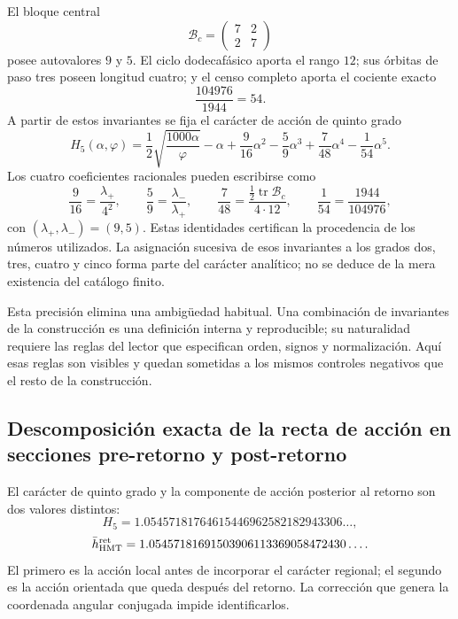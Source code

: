 
El bloque central
\[
\mathcal B_c=\begin{pmatrix}7&2\\2&7\end{pmatrix}
\]
posee autovalores \(9\) y \(5\). El ciclo dodecafásico aporta el rango
\(12\); sus órbitas de paso tres poseen longitud cuatro; y el censo completo
aporta el cociente exacto
\[
\frac{104976}{1944}=54.
\]
A partir de estos invariantes se fija el carácter de acción de quinto grado
\[
\boxed{
H_5(\alpha,\varphi)
=\frac12\sqrt{\frac{1000\alpha}{\varphi}}-\alpha
+\frac9{16}\alpha^2-\frac59\alpha^3
+\frac7{48}\alpha^4-\frac1{54}\alpha^5.}
\]
Los cuatro coeficientes racionales pueden escribirse como
\[
\frac9{16}=\frac{\lambda_+}{4^2},
\qquad
\frac59=\frac{\lambda_-}{\lambda_+},
\qquad
\frac7{48}=\frac{\tfrac12\operatorname{tr}\mathcal B_c}{4\cdot12},
\qquad
\frac1{54}=\frac{1944}{104976},
\]
con \((\lambda_+,\lambda_-)=(9,5)\). Estas identidades certifican la
procedencia de los números utilizados. La asignación sucesiva de esos
invariantes a los grados dos, tres, cuatro y cinco forma parte del carácter
analítico; no se deduce de la mera existencia del catálogo finito.

Esta precisión elimina una ambigüedad habitual. Una combinación de
invariantes de la construcción es una definición interna y reproducible; su
naturalidad requiere las reglas del lector que especifican orden, signos y
normalización. Aquí esas reglas son visibles y quedan sometidas a los mismos
controles negativos que el resto de la construcción.

\subsection{Descomposición exacta de la recta de acción en secciones pre-retorno y post-retorno}
\label{sec:s102:c38:3:3}


El carácter de quinto grado y la componente de acción posterior al retorno
son dos valores distintos:
\[
H_5
=1.05457181764615446962582182943306\ldots,
\]
\[
\bar h_{\rm HMT}^{\rm ret}
=1.05457181691503906113369058472430\ldots.
\]
El primero es la acción local antes de incorporar el carácter regional; el
segundo es la acción orientada que queda después del retorno. La corrección
que genera la coordenada angular conjugada impide identificarlos.

